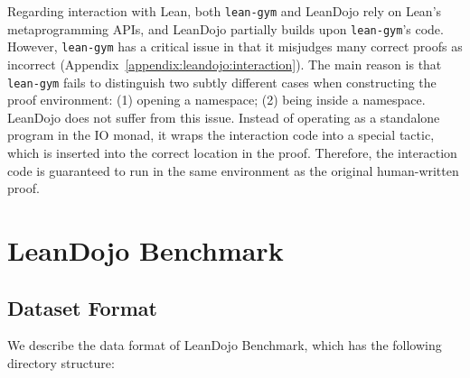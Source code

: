 Regarding interaction with Lean, both \texttt{lean-gym} and LeanDojo rely on Lean's metaprogramming APIs, and LeanDojo partially builds upon \texttt{lean-gym}'s code. However, \texttt{lean-gym} has a critical issue in that it misjudges many correct proofs as incorrect (Appendix~\ref{appendix:leandojo:interaction}). The main reason is that \texttt{lean-gym} fails to distinguish two subtly different cases when constructing the proof environment: (1) opening a namespace; (2) being inside a namespace. LeanDojo does not suffer from this issue. Instead of operating as a standalone program in the IO monad, it wraps the interaction code into a special tactic, which is inserted into the correct location in the proof. Therefore, the interaction code is guaranteed to run in the same environment as the original human-written proof.



\section{LeanDojo Benchmark}
\label{appendix:benchmark}


\subsection{Dataset Format}
\label{appendix:dataformat}

We describe the data format of LeanDojo Benchmark, which has the following directory structure:


